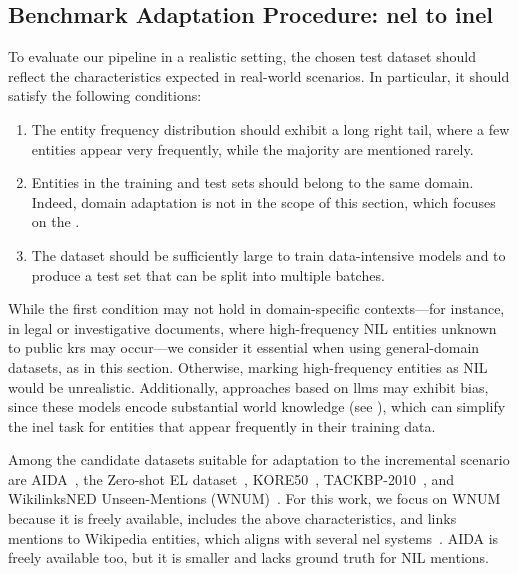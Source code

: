 \subsection{Benchmark Adaptation Procedure: \ac{nel} to \ac{inel}}
\label{sec:ijckg:dataset}
To evaluate our pipeline in a realistic setting, the chosen test dataset should reflect the characteristics expected in real-world scenarios. In particular, it should satisfy the following conditions:

\begin{enumerate}
\item The entity frequency distribution should exhibit a long right tail, where a few entities appear very frequently, while the majority are mentioned rarely.
\item Entities in the training and test sets should belong to the same domain. Indeed, domain adaptation is not in the scope of this section, which focuses on the \nilchallenge.
\item The dataset should be sufficiently large to train data-intensive models and to produce a test set that can be split into multiple batches.
\end{enumerate}

While the first condition may not hold in domain-specific contexts---for instance, in legal or investigative documents, where high-frequency NIL entities unknown to public \acp{kr} may occur---we consider it essential when using general-domain datasets, as in this section. Otherwise, marking high-frequency entities as NIL would be unrealistic. Additionally, approaches based on \acp{llm} may exhibit bias, since these models encode substantial world knowledge (see ), which can simplify the \ac{inel} task for entities that appear frequently in their training data.

Among the candidate datasets suitable for adaptation to the incremental scenario are AIDA~\cite{aida}, the Zero-shot EL dataset~\cite{logeswaran-etal-2019-zero}, KORE50~\cite{kore50}, TACKBP-2010~\cite{ji2010overview}, and WikilinksNED Unseen-Mentions (WNUM)~\cite{Onoe_Durrett_2020}. For this work, we focus on WNUM because it is freely available, includes the above characteristics, and links mentions to Wikipedia entities, which aligns with several \ac{nel} systems~\cite{blink,decao2021autoregressive,barba-etal-2022-extend}. AIDA is freely available too, but it is smaller and lacks ground truth for NIL mentions.

